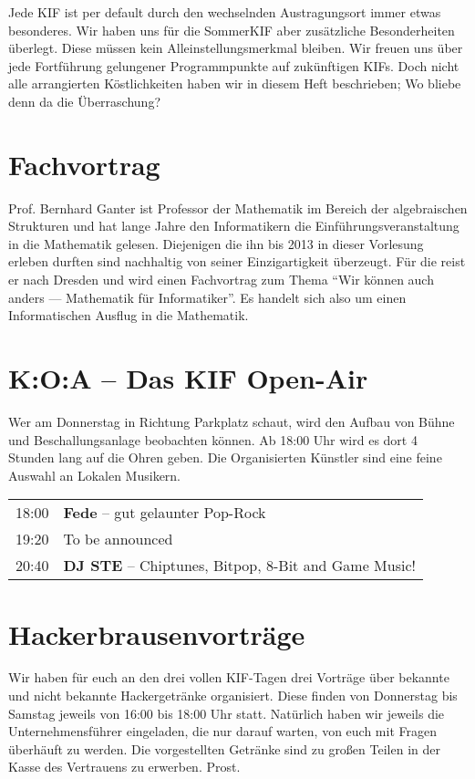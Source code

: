 
Jede KIF ist per default durch den wechselnden Austragungsort immer etwas besonderes.
Wir haben uns für die SommerKIF aber zusätzliche Besonderheiten überlegt.
Diese müssen kein Alleinstellungsmerkmal bleiben.
Wir freuen uns über jede Fortführung gelungener Programmpunkte auf zukünftigen KIFs.
Doch nicht alle arrangierten Köstlichkeiten haben wir in diesem Heft beschrieben; Wo bliebe denn da die Überraschung?

\section*{Fachvortrag}
Prof. Bernhard Ganter ist Professor der Mathematik im Bereich der algebraischen Strukturen und hat lange Jahre den Informatikern die Einführungsveranstaltung in die Mathematik gelesen.
Diejenigen die ihn bis 2013 in dieser Vorlesung erleben durften sind nachhaltig von seiner Einzigartigkeit überzeugt.
Für die \KIF{} reist er nach Dresden und wird einen Fachvortrag zum Thema \enquote{Wir können auch anders --- Mathematik für Informatiker}.
Es handelt sich also um einen Informatischen Ausflug in die Mathematik.

\section*{K:O:A -- Das KIF Open-Air}
Wer am Donnerstag in Richtung Parkplatz schaut, wird den Aufbau von Bühne und Beschallungsanlage beobachten können.
Ab 18:00 Uhr wird es dort 4 Stunden lang auf die Ohren geben.
Die Organisierten Künstler sind eine feine Auswahl an Lokalen Musikern.
\vspace{10pt}

\begin{tabular}{rl}
    18:00 & \textbf{Fede} -- gut gelaunter Pop-Rock \\

    19:20 & To be announced\\

    20:40 & \textbf{DJ STE} -- Chiptunes, Bitpop, 8-Bit and Game Music!
\end{tabular}

\section*{Hackerbrausenvorträge}
Wir haben für euch an den drei vollen KIF-Tagen drei Vorträge über bekannte und nicht bekannte Hackergetränke organisiert.
Diese finden von Donnerstag bis Samstag jeweils von 16:00 bis 18:00 Uhr statt.
Natürlich haben wir jeweils die Unternehmensführer eingeladen, die nur darauf warten, von euch mit Fragen überhäuft zu werden.
Die vorgestellten Getränke sind zu großen Teilen in der Kasse des Vertrauens zu erwerben. Prost.

